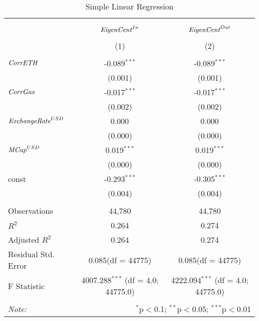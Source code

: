 \begin{table}[!htbp] \centering
  \caption{Simple Linear Regression}
\begin{tabular}{@{\extracolsep{5pt}}lcc}
\\[-1.8ex]\hline
\hline \\[-1.8ex]
\\[-1.8ex] & \multicolumn{1}{c}{${\it EigenCent}^{In}$} & \multicolumn{1}{c}{${\it EigenCent}^{Out}$}  \\
\\[-1.8ex] & (1) & (2) \\
\hline \\[-1.8ex]
 ${\it CorrETH}$ & -0.089$^{***}$ & -0.089$^{***}$ \\
  & (0.001) & (0.001) \\
 ${\it CorrGas}$ & -0.017$^{***}$ & -0.017$^{***}$ \\
  & (0.002) & (0.002) \\
 ${\it ExchangeRate}^{USD}$ & 0.000$^{}$ & 0.000$^{}$ \\
  & (0.000) & (0.000) \\
 ${\it MCap}^{USD}$ & 0.019$^{***}$ & 0.019$^{***}$ \\
  & (0.000) & (0.000) \\
 const & -0.293$^{***}$ & -0.305$^{***}$ \\
  & (0.004) & (0.004) \\
\hline \\[-1.8ex]
 Observations & 44,780 & 44,780 \\
 $R^2$ & 0.264 & 0.274 \\
 Adjusted $R^2$ & 0.264 & 0.274 \\
 Residual Std. Error & 0.085(df = 44775) & 0.085(df = 44775)  \\
 F Statistic & 4007.288$^{***}$ (df = 4.0; 44775.0) & 4222.094$^{***}$ (df = 4.0; 44775.0) \\
\hline
\hline \\[-1.8ex]
\textit{Note:} & \multicolumn{2}{r}{$^{*}$p$<$0.1; $^{**}$p$<$0.05; $^{***}$p$<$0.01} \\
\end{tabular}
\end{table}